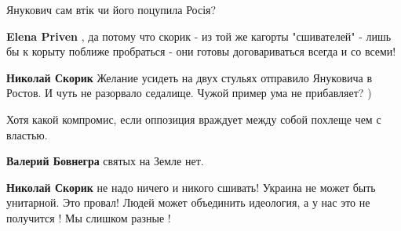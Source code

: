 \begin{itemize}
\begin{itemize}
 
Янукович сам втік чи його поцупила Росія?

 
\textbf{Elena Priven} , да потому что скорик - из той же кагорты "сшивателей" -
лишь бы к корыту поближе пробраться - они готовы договариваться всегда и со
всеми!

 
\textbf{Николай Скорик} Желание усидеть на двух стульях отправило Януковича в Ростов. И чуть не разорвало седалище.
Чужой пример ума не прибавляет? )

 
Хотя какой компромис, если оппозиция враждует между собой похлеще чем с властью.

 

\textbf{Валерий Бовнегра} святых на Земле нет.

 
\textbf{Николай Скорик} не надо ничего и никого сшивать! Украина не может быть
унитарной. Это провал! Людей может объединить идеология, а у нас это не
получится ! Мы слишком разные !


\end{itemize}
\end{itemize}
